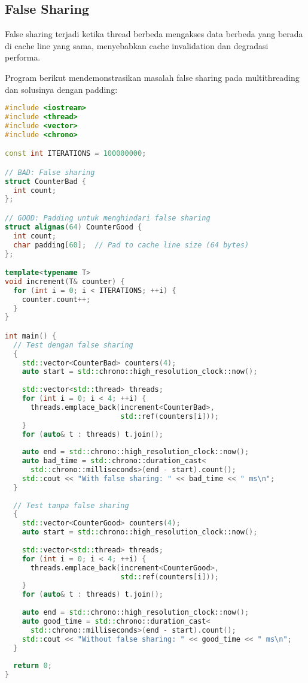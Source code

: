 \documentclass[../main.tex]{subfiles}
\begin{document}
\subsection{False Sharing}
False sharing terjadi ketika thread berbeda mengakses data berbeda yang berada di cache line yang sama, menyebabkan cache invalidation dan degradasi performa.

Program berikut mendemonstrasikan masalah false sharing pada multithreading dan solusinya dengan padding:

\begin{lstlisting}[language=C++, caption={False sharing dan solusinya}]
#include <iostream>
#include <thread>
#include <vector>
#include <chrono>

const int ITERATIONS = 100000000;

// BAD: False sharing
struct CounterBad {
  int count;
};

// GOOD: Padding untuk menghindari false sharing
struct alignas(64) CounterGood {
  int count;
  char padding[60];  // Pad to cache line size (64 bytes)
};

template<typename T>
void increment(T& counter) {
  for (int i = 0; i < ITERATIONS; ++i) {
    counter.count++;
  }
}

int main() {
  // Test dengan false sharing
  {
    std::vector<CounterBad> counters(4);
    auto start = std::chrono::high_resolution_clock::now();
    
    std::vector<std::thread> threads;
    for (int i = 0; i < 4; ++i) {
      threads.emplace_back(increment<CounterBad>, 
                           std::ref(counters[i]));
    }
    for (auto& t : threads) t.join();
    
    auto end = std::chrono::high_resolution_clock::now();
    auto bad_time = std::chrono::duration_cast<
      std::chrono::milliseconds>(end - start).count();
    std::cout << "With false sharing: " << bad_time << " ms\n";
  }
  
  // Test tanpa false sharing
  {
    std::vector<CounterGood> counters(4);
    auto start = std::chrono::high_resolution_clock::now();
    
    std::vector<std::thread> threads;
    for (int i = 0; i < 4; ++i) {
      threads.emplace_back(increment<CounterGood>, 
                           std::ref(counters[i]));
    }
    for (auto& t : threads) t.join();
    
    auto end = std::chrono::high_resolution_clock::now();
    auto good_time = std::chrono::duration_cast<
      std::chrono::milliseconds>(end - start).count();
    std::cout << "Without false sharing: " << good_time << " ms\n";
  }
  
  return 0;
}
\end{lstlisting}
\end{document}
